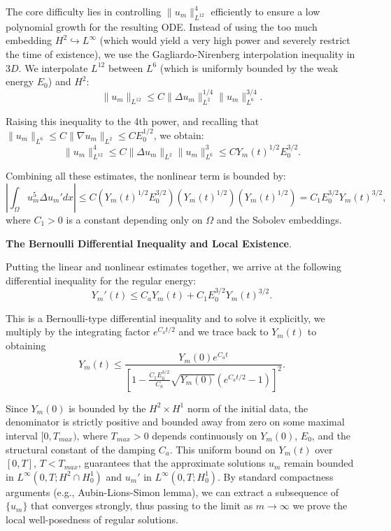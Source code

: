 \documentclass[11pt,letterpaper]{amsart}
\begin{document}
The core difficulty lies in controlling $\|u_m\|_{L^{12}}^4$ efficiently to ensure a low polynomial growth for the resulting ODE. Instead of using the too much embedding $H^2 \hookrightarrow L^\infty$ (which would yield a very high power and severely restrict the time of existence), we use the Gagliardo-Nirenberg interpolation inequality in $3D$. We interpolate $L^{12}$ between $L^6$ (which is uniformly bounded by the weak energy $E_0$) and $H^2$:
$$\|u_m\|_{L^{12}} \le C \|\Delta u_m\|_{L^2}^{1/4} \|u_m\|_{L^6}^{3/4}.$$

Raising this inequality to the 4th power, and recalling that $\|u_m\|_{L^6} \le C \|\nabla u_m\|_{L^2} \le C E_0^{1/2}$, we obtain:
$$\|u_m\|_{L^{12}}^4 \le C \|\Delta u_m\|_{L^2} \|u_m\|_{L^6}^3 \le C Y_m(t)^{1/2} E_0^{3/2}.$$

Combining all these estimates, the nonlinear term is bounded by:
$$\left| \int_\Omega u_m^5 \Delta u_m' dx \right| \le C \left( Y_m(t)^{1/2} E_0^{3/2} \right) \left( Y_m(t)^{1/2} \right) \left( Y_m(t)^{1/2} \right) = C_1 E_0^{3/2} Y_m(t)^{3/2},$$
where $C_1 > 0$ is a constant depending only on $\Omega$ and the Sobolev embeddings.

{\bf The Bernoulli Differential Inequality and Local Existence}.

Putting the linear and nonlinear estimates together, we arrive at the following differential inequality for the regular energy:
$$Y_m'(t) \le C_a Y_m(t) + C_1 E_0^{3/2} Y_m(t)^{3/2}.$$

This is a Bernoulli-type differential inequality and to solve it explicitly, we multiply by the integrating factor $e^{C_a t / 2}$ and we trace back to $Y_m(t)$ to obtaining
$$Y_m(t) \le \frac{Y_m(0) e^{C_a t}}{\left[ 1 - \frac{C_1 E_0^{3/2}}{C_a} \sqrt{Y_m(0)} \left( e^{C_a t / 2} - 1 \right) \right]^2}.$$

Since $Y_m(0)$ is bounded by the $H^2 \times H^1$ norm of the initial data, the denominator is strictly positive and bounded away from zero on some maximal interval $[0, T_{max})$, where $T_{max} > 0$ depends continuously on $Y_m(0)$, $E_0$, and the structural constant of the damping $C_a$. This uniform bound on $Y_m(t)$ over $[0, T]$, $T < T_{max}$, guarantees that the approximate solutions $u_m$ remain bounded in $L^\infty(0, T; H^2 \cap H_0^1)$ and $u_m'$ in $L^\infty(0, T; H_0^1)$. By standard compactness arguments (e.g., Aubin-Lions-Simon lemma), we can extract a subsequence of $\{u_m\}$ that converges strongly, thus passing to the limit as $m \to \infty$ we prove the local well-posedness of regular solutions.
\end{document}
